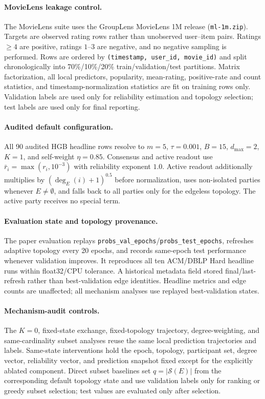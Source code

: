 \documentclass[letterpaper]{article}
\begin{document}
\paragraph{MovieLens leakage control.}
The MovieLens suite uses the GroupLens MovieLens 1M release
(\texttt{ml-1m.zip}). Targets are observed rating rows rather than unobserved
user--item pairs. Ratings $\ge4$ are positive, ratings $1$--$3$ are negative,
and no negative sampling is performed. Rows are ordered by
\texttt{(timestamp, user\_id, movie\_id)} and split chronologically into
70\%/10\%/20\% train/validation/test partitions. Matrix factorization, all
local predictors, popularity, mean-rating, positive-rate and count statistics,
and timestamp-normalization statistics are fit on training rows only.
Validation labels are used only for reliability estimation and topology
selection; test labels are used only for final reporting.

\paragraph{Audited default configuration.}
All 90 audited HGB headline rows resolve to $m=5$, $\tau=0.001$, $B=15$,
$d_{\max}=2$, $K=1$, and self-weight $\eta=0.85$. Consensus and active readout
use $\bar r_i=\max(r_i,10^{-3})$ with reliability exponent $1.0$. Active readout
additionally multiplies by $(\deg_E(i)+1)^{0.5}$ before normalization, uses
non-isolated parties whenever $E\neq\emptyset$, and falls back to all parties
only for the edgeless topology. The active party receives no special term.

\paragraph{Evaluation state and topology provenance.}
The paper evaluation replays
\texttt{probs\_val\_epochs}/\texttt{probs\_test\_epochs}, refreshes adaptive
topology every 20 epochs, and records same-epoch test performance whenever
validation improves. It reproduces all ten ACM/DBLP Hard headline runs within
float32/CPU tolerance. A historical metadata field stored final/last-refresh
rather than best-validation edge identities. Headline metrics and edge counts
are unaffected; all mechanism analyses use replayed best-validation states.

\paragraph{Mechanism-audit controls.}
The $K=0$, fixed-state exchange, fixed-topology trajectory, degree-weighting,
and same-cardinality subset analyses reuse the same local prediction
trajectories and labels. Same-state interventions hold the epoch, topology,
participant set, degree vector, reliability vector, and prediction snapshot
fixed except for the explicitly ablated component. Direct subset baselines set
$q=|\mathcal{S}(E)|$ from the corresponding default topology state and use
validation labels only for ranking or greedy subset selection; test values are
evaluated only after selection.
\end{document}
